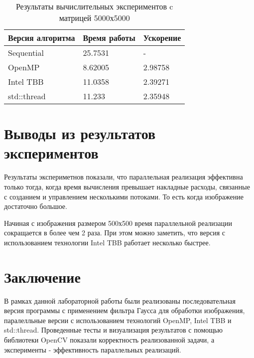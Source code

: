 \documentclass{report}
\begin{document}
\begin{table}[!h]
\caption{Результаты вычислительных экспериментов c матрицей 5000х5000}
\centering
\begin{tabular}{| p{5cm} | p{5cm} | p{5cm} |}
\hline
Версия алгоритма & Время работы & Ускорение  \\[5pt]
\hline
Sequential      & 25.7531       & -            \\
OpenMP          & 8.62005       & 2.98758      \\
Intel TBB       & 11.0358       & 2.39271      \\
std::thread     & 11.233        & 2.35948      \\
\hline
\end{tabular}
\end{table}
\newpage

\section*{Выводы из результатов экспериментов}
\par Результаты экспериметнов показали, что параллельная реализация эффективна только тогда, когда время вычисления превышает накладные расходы, связанные с созданием и управлением несколькими потоками. То есть когда изображение достаточно большое.
\par Начиная с изображения размером 500х500 время параллельной реализации сокращается в более чем 2 раза. При этом можно заметить, что версия с использованием технологии Intel TBB работает несколько быстрее.
\newpage

\section*{Заключение}
\par В рамках данной лабораторной работы были реализованы последовательная версия программы с применением фильтра Гаусса для обработки изображения, паралелльные версии с использованием технологий OpenMP, Intel TBB и std::thread.
Проведенные тесты и визуализация результатов с помощью библиотеки OpenCV показали корректность реализованной задачи, а эксперименты - эффективность параллельных реализаций.
\newpage

\end{document}
